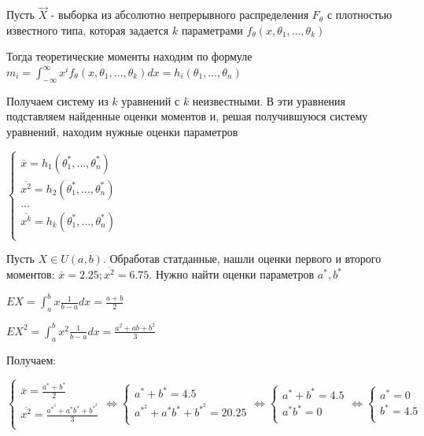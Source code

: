\begin{enumerate}
    Пусть $\vec{X}$ - выборка из абсолютно непрерывного распределения $F_\theta$ с плотностью известного типа, 
    которая задается $k$ параметрами $f_\theta (x, \theta_1, \dots, \theta_k)$

    Тогда теоретические моменты находим по формуле $m_i = \int_{-\infty}^{\infty} x^i f_\theta (x, \theta_1, \dots, \theta_k) dx = h_i(\theta_1, \dots, \theta_n)$

    Получаем систему из $k$ уравнений с $k$ неизвестными. В эти уравнения подставляем найденные оценки
    моментов и, решая получившуюся систему уравнений, находим нужные оценки параметров

    $\begin{cases}
    \overline{x} = h_1(\theta_1^*, \dots, \theta_n^*) \\ 
    \overline{x^2} = h_2(\theta_1^*, \dots, \theta_n^*) \\ 
    \dots \\
    \overline{x^k} = h_k(\theta_1^*, \dots, \theta_n^*) \\ 
    \end{cases}$

    \Ex Пусть $X \in U(a, b)$. Обработав статданные, нашли оценки первого и второго моментов: $\overline{x} = 2.25; \overline{x^2} = 6.75$. 
    Нужно найти оценки параметров $a^*, b^*$

    $EX = \int_a^b x \frac{1}{b - a} dx = \frac{a + b}{2}$

    $EX^2 = \int_a^b x^2 \frac{1}{b - a} dx = \frac{a^2 + ab + b^2}{3}$

    Получаем:

    $\begin{cases}
        \overline{x} = \frac{a^* + b^*}{2} \\ 
        \overline{x^2} = \frac{a^*^2 + a^* b^* + b^*^2}{3} \\ 
    \end{cases} \Longleftrightarrow \begin{cases}
        a^* + b^* = 4.5 \\ 
        a^*^2 + a^* b^* + b^*^2 = 20.25 \\ 
    \end{cases} \Longleftrightarrow \begin{cases}
        a^* + b^* = 4.5 \\ 
        a^* b^* = 0 \\ 
    \end{cases} \Longleftrightarrow \begin{cases}
        a^* = 0 \\ 
        b^* = 4.5 \\ 
    \end{cases}$


\end{enumerate}
